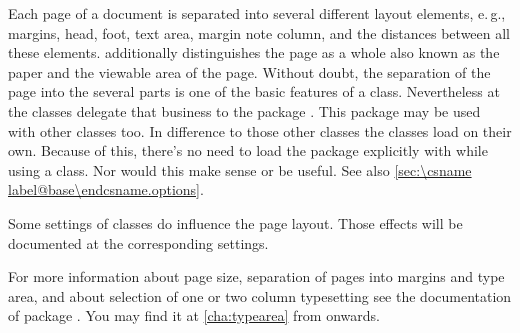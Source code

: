 Each page of a document is separated into several different layout elements,
e.\,g., margins, head, foot, text area, margin note column, and the distances
between all these elements. \KOMAScript{} additionally distinguishes the page
as a whole also known as the paper and the viewable area of the page. Without
doubt, the separation of the page into the several parts is one of the basic
features of a class. Nevertheless at \KOMAScript{} the classes delegate that
business to the package . This package may be used with other
classes too. In difference to those other classes the \KOMAScript{} classes
load  on their own. Because of this, there's no need to load
the package explicitly with  while using a \KOMAScript{}
class. Nor would this make sense or be useful. See also 
\autoref{sec:\csname label@base\endcsname.options}.

Some settings of \KOMAScript{} classes do influence the page layout. Those
effects will be documented at the corresponding settings.

For more information about page size, separation of pages into margins and
type area, and about selection of one or two column typesetting see the
documentation of package . You may find it at
\autoref{cha:typearea} from  onwards.


